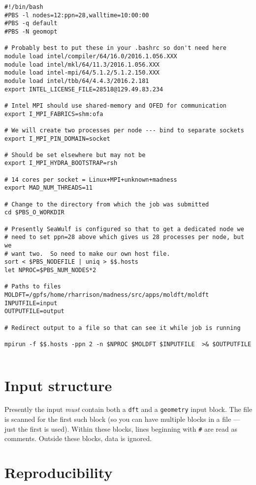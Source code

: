 \documentclass[letterpaper]{book}
\begin{document}
\begin{verbatim}
#!/bin/bash
#PBS -l nodes=12:ppn=28,walltime=10:00:00
#PBS -q default
#PBS -N geomopt

# Probably best to put these in your .bashrc so don't need here
module load intel/compiler/64/16.0/2016.1.056.XXX
module load intel/mkl/64/11.3/2016.1.056.XXX
module load intel-mpi/64/5.1.2/5.1.2.150.XXX
module load intel/tbb/64/4.4.3/2016.2.181
export INTEL_LICENSE_FILE=28518@129.49.83.234

# Intel MPI should use shared-memory and OFED for communication
export I_MPI_FABRICS=shm:ofa

# We will create two processes per node --- bind to separate sockets
export I_MPI_PIN_DOMAIN=socket

# Should be set elsewhere but may not be
export I_MPI_HYDRA_BOOTSTRAP=rsh

# 14 cores per socket = Linux+MPI+unknown+madness
export MAD_NUM_THREADS=11

# Change to the directory from which the job was submitted
cd $PBS_O_WORKDIR

# Presently SeaWulf is configured so that to get a dedicated node we
# need to set ppn=28 above which gives us 28 processes per node, but we
# want two.  So need to make our own host file.
sort < $PBS_NODEFILE | uniq > $$.hosts
let NPROC=$PBS_NUM_NODES*2

# Paths to files
MOLDFT=/gpfs/home/rharrison/madness/src/apps/moldft/moldft
INPUTFILE=input
OUTPUTFILE=output

# Redirect output to a file so that can see it while job is running

mpirun -f $$.hosts -ppn 2 -n $NPROC $MOLDFT $INPUTFILE  >& $OUTPUTFILE
  
\end{verbatim}


\section{Input structure}

Presently the input {\em must} contain both a \verb+dft+ and a
\verb+geometry+ input block.  The file is scanned for the first such
block (so you can have multiple blocks in a file --- just the first is
used). Within these blocks, lines beginning with \verb+#+ are read as comments.
Outside these blocks, data is ignored.

\section{Reproducibility}
\end{document}
